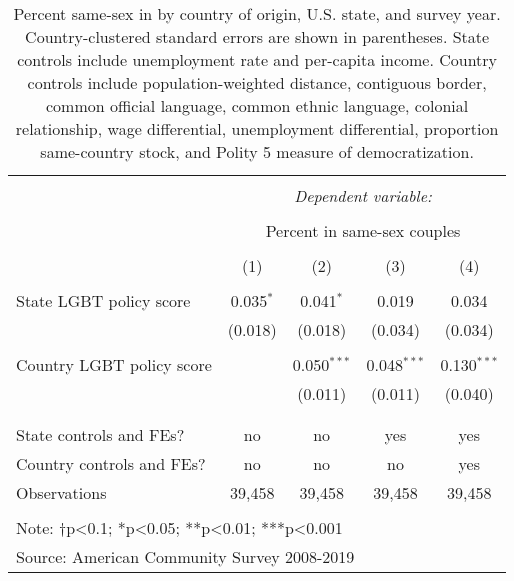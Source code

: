 \documentclass[
  11pt,
]{article}
\begin{document}
\begin{table}[!htbp] \centering 
  \caption{Percent same-sex in by country of origin, U.S. state, and survey year. Country-clustered standard errors are shown in parentheses. State controls include unemployment rate and per-capita income. Country controls include population-weighted distance, contiguous border, common official language, common ethnic language, colonial relationship, wage differential, unemployment differential, proportion same-country stock, and Polity 5 measure of democratization.} 
  \label{tab:state-props} 
\begin{tabular}{@{\extracolsep{5pt}}lcccc} 
\\[-1.8ex]\hline 
\hline \\[-1.8ex] 
 & \multicolumn{4}{c}{\textit{Dependent variable:}} \\ 
\cline{2-5} 
\\[-1.8ex] & \multicolumn{4}{c}{Percent in same-sex couples} \\ 
\\[-1.8ex] & (1) & (2) & (3) & (4)\\ 
\hline \\[-1.8ex] 
 State LGBT policy score & 0.035$^{*}$ & 0.041$^{*}$ & 0.019 & 0.034 \\ 
  & (0.018) & (0.018) & (0.034) & (0.034) \\ 
  & & & & \\ 
 Country LGBT policy score &  & 0.050$^{***}$ & 0.048$^{***}$ & 0.130$^{***}$ \\ 
  &  & (0.011) & (0.011) & (0.040) \\ 
  & & & & \\ 
\hline \\[-1.8ex] 
State controls and FEs? & no & no & yes & yes \\ 
Country controls and FEs? & no & no & no & yes \\ 
Observations & 39,458 & 39,458 & 39,458 & 39,458 \\ 
\hline 
\hline \\[-1.8ex] 
\multicolumn{5}{l}{Note: †p<0.1; *p<0.05; **p<0.01; ***p<0.001} \\ 
\multicolumn{5}{l}{Source: American Community Survey 2008-2019} \\ 
\end{tabular} 
\end{table}
\end{document}
